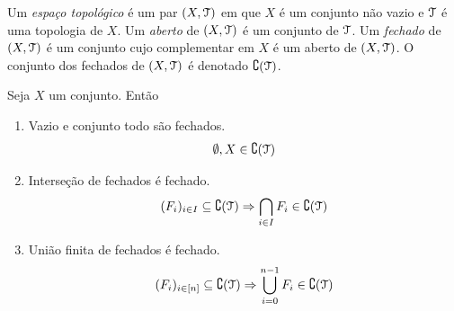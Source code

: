 \begin{definition}
	Um \emph{espaço topológico} é um par $(X,\mathcal{T})$ em que $X$ é um conjunto não vazio e $\mathcal{T}$ é uma topologia de $X$. Um \emph{aberto} de $(X,\mathcal{T})$ é um conjunto de $\mathcal{T}$. Um \emph{fechado} de $(X,\mathcal{T})$ é um conjunto cujo complementar em $X$ é um aberto de $(X,\mathcal{T})$. O conjunto dos fechados de $(X,\mathcal{T})$ é denotado $\complement (\mathcal{T})$.
\end{definition}

\begin{proposition}
	Seja $X$ um conjunto. Então
	\begin{enumerate}
	\item Vazio e conjunto todo são fechados.
	\begin{equation*}
	\emptyset, X \in \complement (\mathcal{T})
	\end{equation*}

	\item Interseção de fechados é fechado.
	\begin{equation*}
	(F_i)_{i \in I} \subseteq \complement (\mathcal{T}) \Rightarrow \bigcap_{i \in I} F_i  \in \complement (\mathcal{T})
	\end{equation*}
	
	\item União finita de fechados é fechado.
	\begin{equation*}
	(F_i)_{i \in [n]} \subseteq \complement (\mathcal{T}) \Rightarrow \bigcup_{i=0}^{n-1} F_i \in \complement (\mathcal{T})
	\end{equation*}
	

	\end{enumerate}
\end{proposition}

